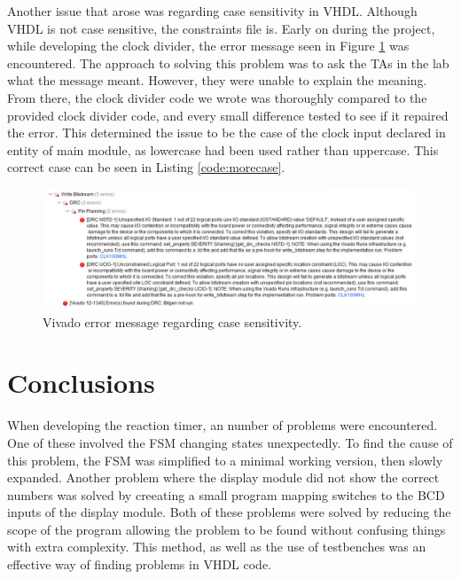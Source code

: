 \documentclass[11pt]{article}
\begin{document}
Another issue that arose was regarding case sensitivity in VHDL. Although VHDL is not case sensitive, the constraints file is. Early on during the project, while developing the clock divider, the error message seen in Figure \ref{fig:error} was encountered. The approach to solving this problem was to ask the TAs in the lab what the message meant. However, they were unable to explain the meaning. From there, the clock divider code we wrote was thoroughly compared to the provided clock divider code, and every small difference tested to see if it repaired the error. This determined the issue to be the case of the clock input declared in entity of main module, as lowercase had been used rather than uppercase. This correct case can be seen in Listing \ref{code:morecase}.

\begin{figure}[H]
  \centering
  \includegraphics[width=0.99\textwidth]{error.png}
  \caption{Vivado error message regarding case sensitivity.}
  \label{fig:error}
\end{figure}

\section{Conclusions}


When developing the reaction timer, an number of problems were encountered. One of these involved the FSM changing states unexpectedly. To find the cause of this problem, the FSM was simplified to a minimal working version, then slowly expanded. Another problem where the display module did not show the correct numbers was solved by creeating a small program mapping switches to the BCD inputs of the display module. Both of these problems were solved by reducing the scope of the program allowing the problem to be found without confusing things with extra complexity. This method, as well as the use of testbenches was an effective way of finding problems in VHDL code.
\end{document}
